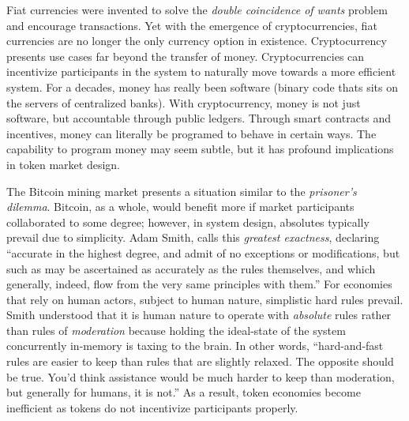 \documentclass{article}
\begin{document}
Fiat currencies were invented to solve the \textit{double coincidence of wants} problem and encourage transactions. Yet with the emergence of cryptocurrencies, fiat currencies are no longer the only currency option in existence. Cryptocurrency presents use cases far beyond the transfer of money. Cryptocurrencies can incentivize participants in the system to naturally move towards a more efficient system. For a decades, money has really been software (binary code thats sits on the servers of centralized banks). With cryptocurrency, money is not just software, but accountable through public ledgers. Through smart contracts and incentives, money can literally be programed to behave in certain ways. The capability to program money may seem subtle, but it has profound implications in token market design.

The Bitcoin mining market presents a situation similar to the \textit{prisoner's dilemma}. Bitcoin, as a whole, would benefit more if market participants collaborated to some degree; however, in system design, absolutes typically prevail due to simplicity. Adam Smith, calls this \textit{greatest exactness}, declaring ``accurate in the highest degree, and admit of no exceptions or modifications, but such as may be ascertained as accurately as the rules themselves, and which generally, indeed, flow from the very same principles with them.''\cite{adamsmith-sentiments} For economies that rely on human actors, subject to human nature, simplistic hard rules prevail. Smith understood that it is human nature to operate with \textit{absolute} rules rather than rules of \textit{moderation} because holding the ideal-state of the system concurrently in-memory is taxing to the brain. In other words, ``hard-and-fast rules are easier to keep than rules that are slightly relaxed. The opposite should be true. You'd think assistance would be much harder to keep than moderation, but generally for humans, it is not.''\cite{roberts-howadamsmith} As a result, token economies become inefficient as tokens do not incentivize participants properly.
\end{document}
